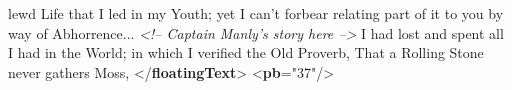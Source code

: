 \begin{shaded}
\hspace*{1em}\hspace*{1em}\hspace*{1em}\hspace*{1em} lewd Life that I led in my Youth; yet I can't forbear relating part of\mbox{}\newline 
\hspace*{1em}\hspace*{1em}\hspace*{1em}\hspace*{1em} it to you by way of Abhorrence...\mbox{}\newline 
\hspace*{1em}\hspace*{1em}\mbox{}\newline 
\textit{<!-- Captain Manly's story here -->}\mbox{}\newline 
\hspace*{1em}\hspace*{1em}\hspace*{1em}\hspace*{1em} I had lost and spent all I had in the World; in which I verified the\mbox{}\newline 
\hspace*{1em}\hspace*{1em}\hspace*{1em}\hspace*{1em} Old Proverb, That a Rolling Stone never gathers Moss,\mbox{}\newline 
\hspace*{1em}\mbox{}\newline 
{}\mbox{}\newline 
{</\textbf{floatingText}>}\mbox{}\newline 
{<\textbf{pb}\hspace*{1em}{n}="{37}"/>}\end{shaded}\egroup\par \par
